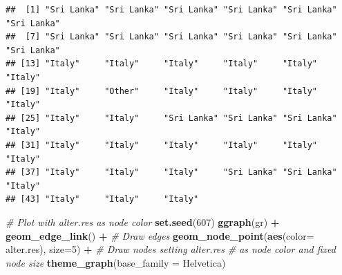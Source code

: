 \documentclass[
]{book}
\newenvironment{Shaded}{\begin{snugshade}}{\end{snugshade}}
\newcommand{\AttributeTok}[1]{\textcolor[rgb]{0.13,0.29,0.53}{#1}}
\newcommand{\CommentTok}[1]{\textcolor[rgb]{0.56,0.35,0.01}{\textit{#1}}}
\newcommand{\DecValTok}[1]{\textcolor[rgb]{0.00,0.00,0.81}{#1}}
\newcommand{\FunctionTok}[1]{\textcolor[rgb]{0.13,0.29,0.53}{\textbf{#1}}}
\newcommand{\NormalTok}[1]{#1}
\newcommand{\SpecialCharTok}[1]{\textcolor[rgb]{0.81,0.36,0.00}{\textbf{#1}}}
\newcommand{\StringTok}[1]{\textcolor[rgb]{0.31,0.60,0.02}{#1}}
\begin{document}
\begin{Shaded}
\end{Shaded}

\begin{verbatim}
##  [1] "Sri Lanka" "Sri Lanka" "Sri Lanka" "Sri Lanka" "Sri Lanka" "Sri Lanka"
##  [7] "Sri Lanka" "Sri Lanka" "Sri Lanka" "Sri Lanka" "Sri Lanka" "Sri Lanka"
## [13] "Italy"     "Italy"     "Italy"     "Italy"     "Italy"     "Italy"    
## [19] "Italy"     "Other"     "Italy"     "Italy"     "Italy"     "Italy"    
## [25] "Italy"     "Italy"     "Sri Lanka" "Sri Lanka" "Sri Lanka" "Italy"    
## [31] "Italy"     "Italy"     "Italy"     "Italy"     "Italy"     "Italy"    
## [37] "Italy"     "Italy"     "Italy"     "Sri Lanka" "Sri Lanka" "Italy"    
## [43] "Italy"     "Italy"     "Italy"
\end{verbatim}

\begin{Shaded}
\begin{Highlighting}[]
\CommentTok{\# Plot with alter.res as node color}
\FunctionTok{set.seed}\NormalTok{(}\DecValTok{607}\NormalTok{)}
\FunctionTok{ggraph}\NormalTok{(gr) }\SpecialCharTok{+} 
  \FunctionTok{geom\_edge\_link}\NormalTok{() }\SpecialCharTok{+} \CommentTok{\# Draw edges}
  \FunctionTok{geom\_node\_point}\NormalTok{(}\FunctionTok{aes}\NormalTok{(}\AttributeTok{color=}\NormalTok{ alter.res), }\AttributeTok{size=}\DecValTok{5}\NormalTok{) }\SpecialCharTok{+} \CommentTok{\# Draw nodes setting alter.res }
  \CommentTok{\# as node color and fixed node size}
  \FunctionTok{theme\_graph}\NormalTok{(}\AttributeTok{base\_family =} \StringTok{\textquotesingle{}Helvetica\textquotesingle{}}\NormalTok{)}
\end{Highlighting}
\end{Shaded}
\end{document}
